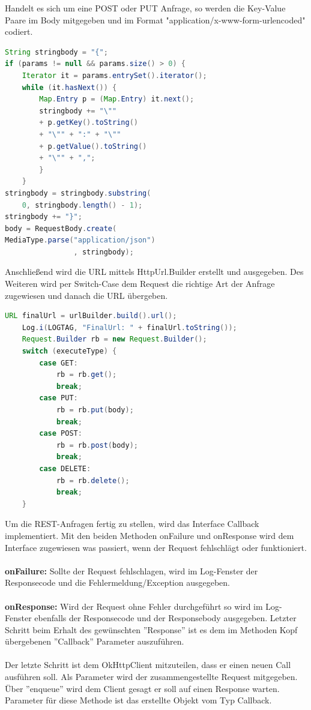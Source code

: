 Handelt es sich um eine POST oder PUT Anfrage, so werden die Key-Value Paare im Body mitgegeben und im Format "application/x-www-form-urlencoded" codiert.
\begin{lstlisting}[language=Java,caption={POST oder PUT Request}]
String stringbody = "{";
if (params != null && params.size() > 0) {
  	Iterator it = params.entrySet().iterator();
    while (it.hasNext()) {
       	Map.Entry p = (Map.Entry) it.next();
        stringbody += "\"" 
        + p.getKey().toString() 
        + "\"" + ":" + "\"" 
        + p.getValue().toString() 
        + "\"" + ",";
        }
    }
stringbody = stringbody.substring(
  	0, stringbody.length() - 1);
stringbody += "}";
body = RequestBody.create(
MediaType.parse("application/json")
       			, stringbody);
\end{lstlisting}
Anschließend wird die URL mittels HttpUrl.Builder erstellt und ausgegeben. 
Des Weiteren wird per Switch-Case dem Request die richtige Art der Anfrage zugewiesen und danach die URL übergeben. 
\begin{lstlisting}[language=Java,caption={Zuweisung der Art der Anfrage}]
URL finalUrl = urlBuilder.build().url();
    Log.i(LOGTAG, "FinalUrl: " + finalUrl.toString());
    Request.Builder rb = new Request.Builder();
    switch (executeType) {
        case GET:
            rb = rb.get();
            break;
        case PUT:
            rb = rb.put(body);
            break;
        case POST:
            rb = rb.post(body);
            break;
        case DELETE:
            rb = rb.delete();
            break;
    }
\end{lstlisting}
Um die REST-Anfragen fertig zu stellen, wird das Interface Callback implementiert. Mit den beiden Methoden onFailure und onResponse wird dem Interface zugewiesen was passiert, wenn der Request fehlschlägt oder funktioniert. 
\\
\\
\textbf{onFailure:}
Sollte der Request fehlschlagen, wird im Log-Fenster der Responsecode und die Fehlermeldung/Exception ausgegeben. 
\\
\\
\textbf{onResponse:}
Wird der Request ohne Fehler durchgeführt so wird im Log-Fenster ebenfalls der Responsecode und der Responsebody ausgegeben. Letzter Schritt beim Erhalt des gewünschten ''Response'' ist es dem im Methoden Kopf übergebenen ''Callback'' Parameter auszuführen.
\\ 
\\
Der letzte Schritt ist dem OkHttpClient mitzuteilen, dass er einen neuen Call ausführen soll. Als Parameter wird der zusammengestellte Request mitgegeben. Über ''enqueue'' wird dem Client gesagt er soll auf einen Response warten. Parameter für diese Methode ist das erstellte Objekt vom Typ Callback.
